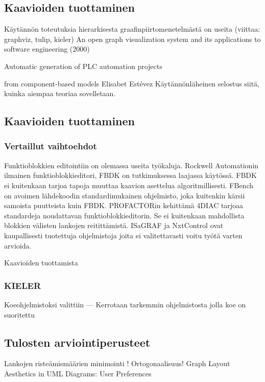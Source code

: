\documentclass[finnish,12pt]{article}
\begin{document}
		\subsection{Kaavioiden tuottaminen}

Käytännön toteutuksia hierarkisesta graafinpiirtomenetelmästä on useita
(viittaa: graphviz, tulip, kieler)
An open graph visualization system and its applications to software engineering
(2000) 

Automatic generation of PLC automation projects

from component-based models
Elisabet Estévez
Käytännönläheinen selostus siitä, kuinka aiempaa teoriaa sovelletaan.

		\subsection{Kaavioiden tuottaminen}
			\subsubsection{Vertaillut vaihtoehdot}
	
Funktioblokkien editointiin on olemassa useita työkaluja.
Rockwell Automationin ilmainen funktioblokkieditori, FBDK on tutkimuksessa
laajassa käytössä.
FBDK ei kuitenkaan tarjoa tapoja muuttaa kaavion asettelua algoritmillisesti.
FBench on avoimen lähdekoodin standardimukainen ohjelmisto, joka kuitenkin
kärsii samoista puutteista kuin FBDK.
PROFACTORin kehittämä 4DIAC tarjoaa standardeja noudattavan funktioblokkieditorin.
Se ei kuitenkaan mahdollista blokkien välisten lankojen reitittämistä.
ISaGRAF ja NxtControl ovat kaupallisesti tuotettuja ohjelmistoja joita ei valitettavasti voitu työtä varten arvioida.

Kaavioiden tuottamista 

			\subsubsection{KIELER}

Koeohjelmistoksi valittiin --- 
Kerrotaan tarkemmin ohjelmistosta jolla koe on suoritettu

		\subsection{Tulosten arviointiperusteet}

Lankojen risteämismäärien minimointi !
Ortogonaalisuus!
Graph Layout Aesthetics in UML Diagrams: User Preferences
\end{document}
